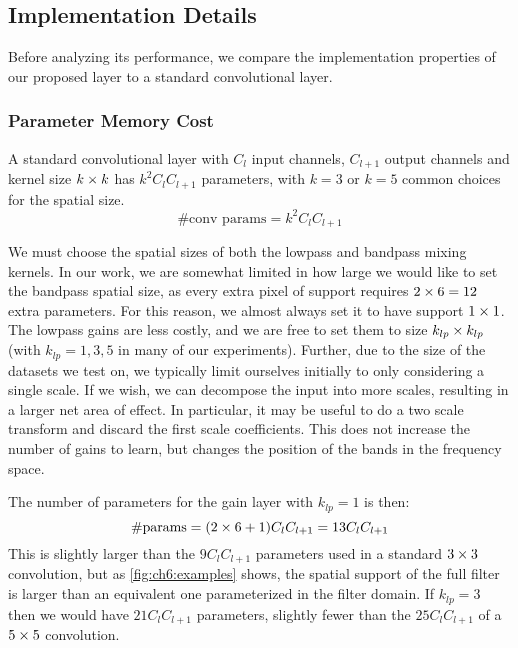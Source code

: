 \subsection{Implementation Details}
Before analyzing its performance, we compare the implementation properties of
our proposed layer to a standard convolutional layer.

\subsubsection{Parameter Memory Cost}\label{sec:ch6:memory}
A standard convolutional layer with $C_l$ input channels, $C_{l+1}$ output channels
and kernel size $k\times k$ has $k^2C_{l}C_{l+1}$ parameters, with $k=3$ or $k=5$
common choices for the spatial size.
\begin{equation}
  \text{\#conv params} = k^2C_lC_{l+1}
\end{equation}

We must choose the spatial sizes of both the lowpass and bandpass
mixing kernels. In our work, we are somewhat limited in how large we would like
to set the bandpass spatial size, as every extra pixel of support requires $2\times
6=12$ extra parameters. For this reason, we almost always set it to have 
support $1\times 1$. The lowpass gains are less costly, and we are free to set them to size
$k_{lp}\times k_{lp}$ (with $k_{lp} = 1,3,5$ in many of our experiments).
%
Further, due to the size of the datasets we test on, we typically limit
ourselves initially to only considering a single scale. If we wish, we can
decompose the input into more scales, resulting in a larger net area of effect.
In particular, it may be useful to do a two scale transform and discard the
first scale coefficients. This does not increase the number of gains to learn,
but changes the position of the bands in the frequency space.

The number of parameters for the gain layer with $k_{lp}=1$ is then:
\begin{equation}
  \text{\#params} = (2\times 6 + 1)C_lC_{l+1} = 13C_lC_{l+1} \label{eq:ch6:memcost2}
\end{equation} 
%
This is slightly larger than the $9C_lC_{l+1}$ parameters used in a
standard $3\times 3$ convolution, but as \autoref{fig:ch6:examples} shows, the
spatial support of the full filter is larger than an equivalent one
parameterized in the filter domain. If $k_{lp}=3$ then we would have $21C_l
C_{l+1}$ parameters, slightly fewer than the $25C_l C_{l+1}$ of a $5\times 5$ convolution.

